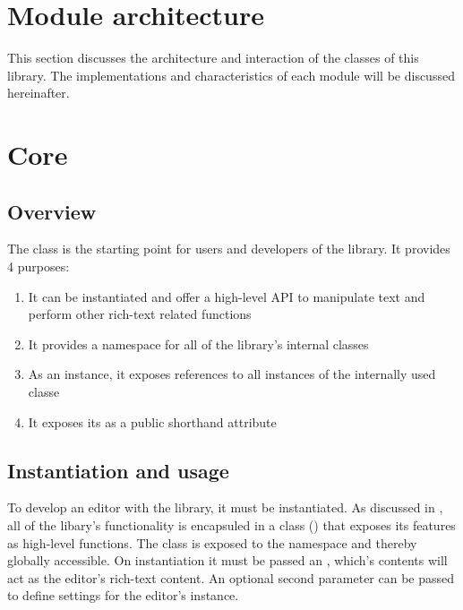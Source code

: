 \section{Module architecture}

This section discusses the architecture and interaction of the classes of this library. The implementations and characteristics of each module will be discussed hereinafter.



\section{Core}
\label{sec:core}

\subsection{Overview}

The  class is the starting point for users and developers of the library. It provides 4 purposes:

\begin{enumerate}
\item It can be instantiated and offer a high-level API to manipulate text and perform other rich-text related functions
\item It provides a namespace for all of the library's internal classes
\item As an instance, it exposes references to all instances of the internally used classe
\item It exposes its  as a public shorthand attribute
\end{enumerate}

\subsection{Instantiation and usage}

To develop an editor with the library, it must be instantiated. As discussed in , all of the libary's functionality is encapsuled in a class () that exposes its features as high-level functions. The  class is exposed to the  namespace and thereby globally accessible. On instantiation it must be passed an , which's contents will act as the editor's rich-text content. An optional second parameter can be passed to define settings for the editor's instance.


